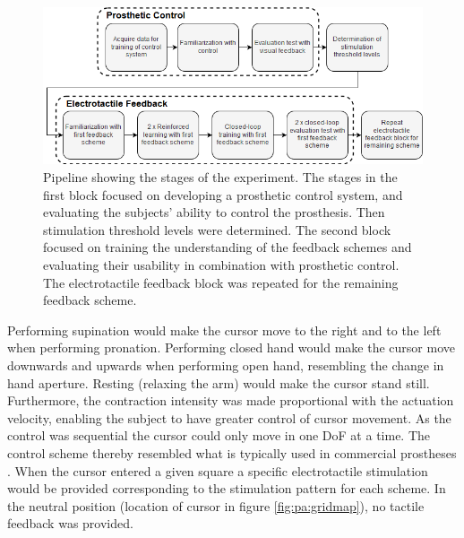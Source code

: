 \begin{figure}[h]
	\includegraphics[width=.85\textwidth]{figures/std_paper}
	\caption{Pipeline showing the stages of the experiment. The stages in the first block focused on developing a prosthetic control system, and evaluating the subjects' ability to control the prosthesis. Then stimulation threshold levels were determined. The second block focused on training the understanding of the feedback schemes and evaluating their usability in combination with prosthetic control. The electrotactile feedback block was repeated for the remaining feedback scheme.}
	\label{fig:pa:std_pap} 
\end{figure}

Performing supination would make the cursor move to the right and to the left when performing pronation. Performing closed hand would make the cursor move downwards and upwards when performing open hand, resembling the change in hand aperture. Resting (relaxing the arm) would make the cursor stand still. Furthermore, the contraction intensity was made proportional with the actuation velocity, enabling the subject to have greater control of cursor movement. As the control was sequential the cursor could only move in one DoF at a time. The control scheme thereby resembled what is typically used in commercial prostheses \cite{Atzori2015}. When the cursor entered a given square a specific electrotactile stimulation would be provided corresponding to the stimulation pattern for each scheme. In the neutral position (location of cursor in figure \ref{fig:pa:gridmap}), no tactile feedback was provided.   
  

